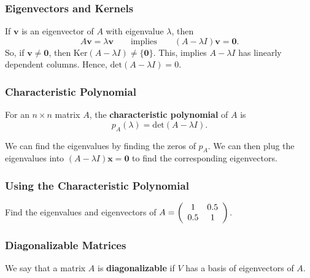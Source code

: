 \documentclass{beamer}
\begin{document}
\begin{frame}
\frametitle{Eigenvectors and Kernels}
If ${\boldsymbol v}$ is an eigenvector of $A$ with eigenvalue $\lambda$, then
$$
A{\boldsymbol v} = \lambda {\boldsymbol v}\qquad\text{implies}\qquad (A - \lambda I){\boldsymbol v} = {\boldsymbol 0}.
$$
So, if ${\boldsymbol v}\neq {\boldsymbol 0}$, then $\text{Ker}(A - \lambda I) \neq \{{\boldsymbol 0}\}$. This, implies $A - \lambda I$ has linearly dependent columns. Hence, $\text{det}(A - \lambda I) = 0$.

\end{frame}

\begin{frame}

\begin{Definition}
\frametitle{Characteristic Polynomial}
For an $n\times n$ matrix $A$, the {\bf characteristic polynomial} of $A$ is
$$
p_A(\lambda) = \text{det}(A - \lambda I).
$$
\end{Definition}
We can find the eigenvalues by finding the zeros of $p_A$. We can then plug the eigenvalues into $(A - \lambda I){\boldsymbol x} = {\boldsymbol 0}$ to find the corresponding eigenvectors.
\end{frame}

\begin{frame}[t]
\frametitle{Using the Characteristic Polynomial}
\begin{Example}
Find the eigenvalues and eigenvectors of $A = \left(\begin{array}{c c} 1	&	0.5\\ 0.5	&	1\end{array}\right)$.
\end{Example}

\end{frame}

\begin{frame}
\frametitle{Diagonalizable Matrices}
\begin{Definition}
We say that a matrix $A$ is {\bf diagonalizable} if $V$ has a basis of eigenvectors of $A$.
\end{Definition}
\end{frame}
\end{document}
